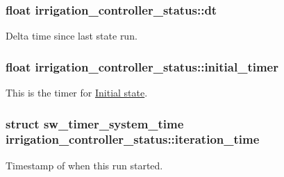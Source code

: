 \subsubsection[{dt}]{\setlength{\rightskip}{0pt plus 5cm}float irrigation\+\_\+controller\+\_\+status\+::dt}\label{structirrigation__controller__status_a0a4447a8aa2200bacf97bd7e844493c1}


Delta time since last state run. 

\hypertarget{structirrigation__controller__status_a9d70c74fe395ec2720089b929a32e1e9}{}
\subsubsection[{initial\+\_\+timer}]{\setlength{\rightskip}{0pt plus 5cm}float irrigation\+\_\+controller\+\_\+status\+::initial\+\_\+timer}\label{structirrigation__controller__status_a9d70c74fe395ec2720089b929a32e1e9}


This is the timer for \hyperlink{group__state__init}{Initial state}. 

\hypertarget{structirrigation__controller__status_a1ae5ffb12725754d8309452cf24a2a28}{}
\subsubsection[{iteration\+\_\+time}]{\setlength{\rightskip}{0pt plus 5cm}struct {\bf sw\+\_\+timer\+\_\+system\+\_\+time} irrigation\+\_\+controller\+\_\+status\+::iteration\+\_\+time}\label{structirrigation__controller__status_a1ae5ffb12725754d8309452cf24a2a28}


Timestamp of when this run started. 

\hypertarget{structirrigation__controller__status_ab795e232c4e2d405b11e24312a6163c3}{}
